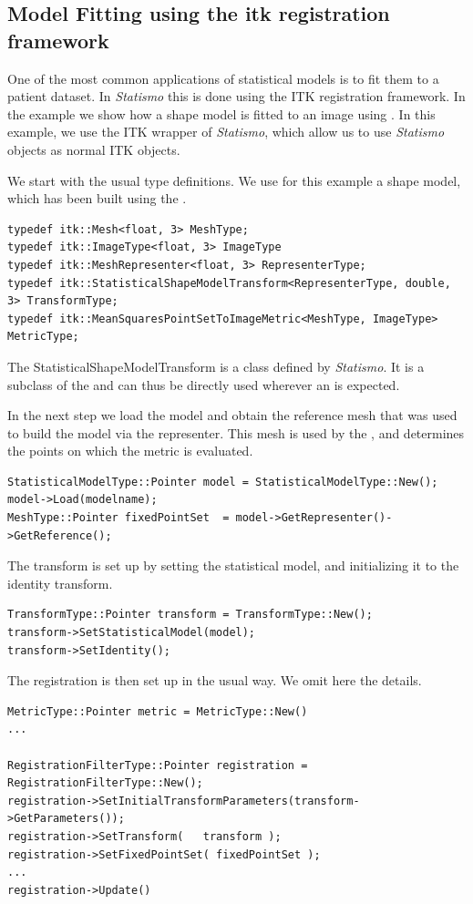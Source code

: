 \documentclass{InsightArticle}
\newcommand{\Statismo}{\emph{Statismo}\xspace}
\begin{document}
\subsection{Model Fitting using the itk registration framework}\label{sec:model-fitting}
One of the most common applications of statistical models is to fit them to a patient dataset. 
In \Statismo this is done using the ITK registration framework. In the example 
we show how a shape model is fitted to an image using . 
In this example, we use the ITK wrapper of \Statismo, which allow us to use \Statismo objects as normal ITK objects.

We start with the usual type definitions. We use for this example a shape model, which has been 
built using the . 
\begin{verbatim}
typedef itk::Mesh<float, 3> MeshType;
typedef itk::ImageType<float, 3> ImageType
typedef itk::MeshRepresenter<float, 3> RepresenterType;
typedef itk::StatisticalShapeModelTransform<RepresenterType, double, 3> TransformType;
typedef itk::MeanSquaresPointSetToImageMetric<MeshType, ImageType> MetricType;
\end{verbatim}
The StatisticalShapeModelTransform is a class defined by \Statismo. It is a subclass of the 
and can thus be directly used wherever an  is expected. 

In the next step we load the model and obtain the reference mesh that was used to build the model via
the representer. This mesh is used by the , and determines the points on which the 
metric is evaluated. 
\begin{verbatim}
StatisticalModelType::Pointer model = StatisticalModelType::New();
model->Load(modelname);
MeshType::Pointer fixedPointSet  = model->GetRepresenter()->GetReference();
\end{verbatim}

The transform is set up by setting the statistical model, and initializing it to the identity transform. 
\begin{verbatim}
TransformType::Pointer transform = TransformType::New();
transform->SetStatisticalModel(model);
transform->SetIdentity();
\end{verbatim}

The registration is then set up in the usual way. We omit here the details.
\begin{verbatim}
MetricType::Pointer metric = MetricType::New()
...

RegistrationFilterType::Pointer registration = RegistrationFilterType::New();
registration->SetInitialTransformParameters(transform->GetParameters());
registration->SetTransform(   transform );
registration->SetFixedPointSet( fixedPointSet );
...
registration->Update()
\end{verbatim}
\end{document}
